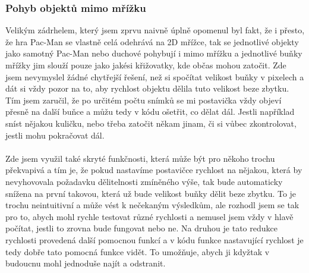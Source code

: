\documentclass[a4]{article}
\begin{document}
\subsubsection{Pohyb objektů mimo mřížku}
Velikým zádrhelem, který jsem zprvu naivně úplně opomenul byl fakt, že i přesto, že hra Pac-Man se vlastně celá odehrává na 2D mřížce, tak se jednotlivé objekty jako samotný Pac-Man nebo duchové pohybují i mimo mřížku a jednotlivé buňky mřížky jim slouží pouze jako jakési křižovatky, kde občas mohou zatočit. Zde jsem nevymyslel žádné chytřejší řešení, než si spočítat velikost buňky v pixelech a dát si vždy pozor na to, aby rychlost objektu dělila tuto velikost beze zbytku. Tím jsem zaručil, že po určitém počtu snímků se mi postavička vždy objeví přesně na další buňce a můžu tedy v kódu ošetřit, co dělat dál. Jestli například sníst nějakou kuličku, nebo třeba zatočit někam jinam, či si vůbec zkontrolovat, jestli mohu pokračovat dál.
\\\\
Zde jsem využil také skryté funkčnosti, která může být pro někoho trochu překvapivá a tím je, že pokud nastavíme postavičce rychlost na nějakou, která by nevyhovovala požadavku dělitelnosti zmíněného výše, tak bude automaticky snížena na první takovou, která už bude velikost buňky dělit beze zbytku. To je trochu neintuitivní a může vést k nečekaným výsledkům, ale rozhodl jsem se tak pro to, abych mohl rychle testovat různé rychlosti a nemusel jsem vždy v hlavě počítat, jestli to zrovna bude fungovat nebo ne. Na druhou je tato redukce rychlosti provedená další pomocnou funkcí a v kódu funkce nastavující rychlost je tedy dobře tato pomocná funkce vidět. To umožňuje, abych ji kdyžtak v budoucnu mohl jednoduše najít a odstranit.
\end{document}

